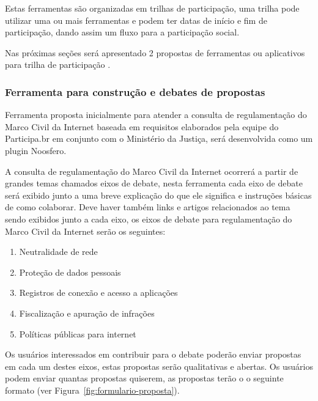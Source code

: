 \documentclass[12pt]{article}
\begin{document}
Estas ferramentas são organizadas em trilhas de participação, uma trilha
pode utilizar uma ou mais ferramentas e podem ter datas de início e fim de
participação, dando assim um fluxo para a participação social.

Nas próximas seções será apresentado 2 propostas de ferramentas ou aplicativos
para trilha de participação .

\subsubsection{Ferramenta para construção e debates de propostas}

Ferramenta proposta inicialmente para atender a consulta de regulamentação do
Marco Civil da Internet baseada em requisitos elaborados pela equipe do
Participa.br em conjunto com o Ministério da Justiça, será desenvolvida como
um plugin Noosfero.

A consulta de regulamentação do Marco Civil da Internet ocorrerá a partir de
grandes temas chamados eixos de debate, nesta ferramenta cada eixo de debate
será exibido junto a uma breve explicação do que ele significa e instruções
básicas de como colaborar. Deve haver também links e artigos relacionados ao
tema sendo exibidos junto a cada eixo, os eixos de debate para regulamentação
do Marco Civil da Internet serão os seguintes:

\begin{enumerate}
  \item Neutralidade de rede
  \item Proteção de dados pessoais
  \item Registros de conexão e acesso a aplicações
  \item Fiscalização e apuração de infrações
  \item Políticas públicas para internet
\end{enumerate}

Os usuários interessados em contribuir para o debate poderão enviar propostas
em cada um destes eixos, estas propostas serão qualitativas e abertas. Os
usuários podem enviar quantas propostas quiserem, as propostas terão o
o seguinte formato (ver Figura~\ref{fig:formulario-proposta}).
\end{document}
